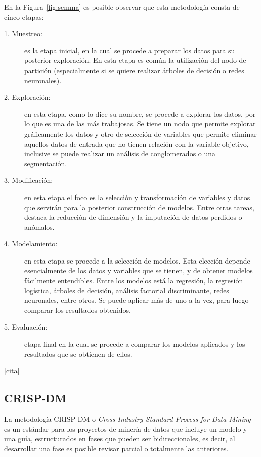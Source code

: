 En la Figura~\ref{fig:semma} es posible observar que esta metodología consta de cinco etapas:
\begin{description}
  \item[1. Muestreo:] es la etapa inicial, en la cual se procede a preparar los datos para su posterior exploración. En esta etapa es común la utilización del nodo de partición (especialmente si se quiere realizar árboles de decisión o redes neuronales). 
  \item[2. Exploración:] en esta etapa, como lo dice su nombre, se procede a explorar los datos, por lo que es una de las más trabajosas. Se tiene un nodo que permite explorar gráficamente los datos y otro de selección de variables que permite eliminar aquellos datos de entrada que no tienen relación con la variable objetivo, inclusive se puede realizar un análisis de conglomerados o una segmentación.
  \item[3. Modificación:] en esta etapa el foco es la selección y transformación de variables y datos que servirán para la posterior construcción de modelos. Entre otras tareas, destaca la reducción de dimensión y la imputación de datos perdidos o anómalos.
  \item[4. Modelamiento:] en esta etapa se procede a la selección de modelos. Esta elección depende esencialmente de los datos y variables que se tienen, y de obtener modelos fácilmente entendibles. Entre los modelos está la regresión, la regresión logística, árboles de decisión, análisis factorial discriminante, redes neuronales, entre otros. Se puede aplicar más de uno a la vez, para luego comparar los resultados obtenidos.
  \item[5. Evaluación:] etapa final en la cual se procede a comparar los modelos aplicados y los resultados que se obtienen de ellos. 
\end{description}
[cita]

\subsection{CRISP-DM}
La metodología CRISP-DM o \textit{Cross-Industry Standard Process for Data Mining} es un estándar para los proyectos de minería de datos que incluye un modelo y una guía, estructurados en fases que pueden ser bidireccionales, es decir, al desarrollar una fase es posible revisar parcial o totalmente las anteriores. 

